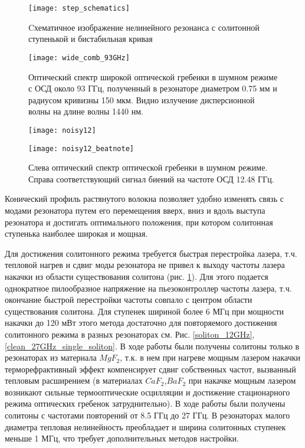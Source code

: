\begin{figure}[ht]
\centering
  \texttt{[image: step\_schematics]}
  \caption{Cхематичное изображение нелинейного резонанса с солитонной ступенькой и бистабильная кривая}
  \label{step_schematics}
\end{figure}

\begin{figure}[ht]
\centering
  \texttt{[image: wide\_comb\_93GHz]}
  \caption{Оптический спектр широкой оптической гребенки в шумном режиме с ОСД около 93 ГГц, полученный в резонаторе диаметром 0.75 мм и радиусом кривизны 150 мкм. Видно излучение дисперсионной волны на длине волны 1440 нм.}
  \label{wide_comb_93GHz}
\end{figure}

\begin{figure}[ht]
  \begin{minipage}[ht]{0.49\linewidth}\centering
    \texttt{[image: noisy12]}
  \end{minipage}
  \hfill
  \begin{minipage}[ht]{0.49\linewidth}\centering
    \texttt{[image: noisy12\_beatnote]}
  \end{minipage}
  \caption{Слева оптический спектр оптической гребенки в шумном режиме. Справа соответствующий сигнал биений на частоте ОСД 12.48 ГГц.}
  \label{noisy12}
\end{figure}

Конический профиль растянутого волокна позволяет удобно изменять связь с модами резонатора путем его перемещения вверх, вниз и вдоль выступа резонатора и достигать оптимального положения, при котором солитонная ступенька наиболее широкая и мощная.

Для достижения солитонного режима требуется быстрая перестройка лазера, т.ч. тепловой нагрев и сдвиг моды резонатора не привел к выходу частоты лазера накачки из области существования солитона (рис. \ref{step_schematics}). Для этого подается однократное пилообразное напряжение на пьезоконтроллер частоты лазера, т.ч. окончание быстрой перестройки частоты совпало с центром области существования солитона. Для ступенек шириной более 6 МГц при мощности накачки до 120 мВт этого метода достаточно для повторяемого достижения солитонного режима в разных резонаторах см. Рис. \ref{soliton_12GHz},\ref{clean_27GHz_single_soliton}. В ходе работы были получены солитоны только в резонаторах из материала $MgF_2$, т.к. в нем при нагреве мощным лазером накачки терморефрактивный эффект компенсирует сдвиг собственных частот, вызванный тепловым расширением (в материалах $CaF_2$,$BaF_2$ при накачке мощным лазером возникают сильные термооптические осцилляции и достижение стационарного режима оптических гребенок затруднительно). В ходе работы были получены солитоны с частотами повторений от 8.5 ГГц до 27 ГГц. В резонаторах малого диаметра тепловая нелинейность преобладает и ширина солитонных ступенек меньше 1 МГц, что требует дополнительных методов настройки.

